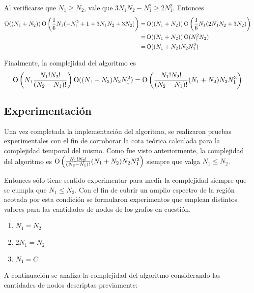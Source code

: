 \newpage
Al verificarse que $N_1 \geq N_2$, vale que $3N_1N_2 - N_1^2 \geq 2N_1^2$.
Entonces
\begin{align*}
\operatorname{O}((N_1 + N_2))  \operatorname{O}\left(\frac{1}{6}N_1(-N_1^2 + 1 + 3N_1N_2 + 3N_2)\right)
=& \operatorname{O}((N_1 + N_2))  \operatorname{O}\left(\frac{1}{6}N_1(2N_1N_2 + 3N_2)\right) \\
=& \operatorname{O}((N_1 + N_2))  \operatorname{O}(N_1^2N_2) \\
=& \operatorname{O}((N_1 + N_2)  N_2  N_1^2)
\end{align*}

Finalmente, la complejidad del algoritmo es
\[
\operatorname{O}\left(N_1 \frac{N_1!  N_2!}{(N_2 - N_1)!}\right) \operatorname{O}((N_1 + N_2)  N_2  N_1^2) =
\operatorname{O}\left(\frac{N_1!  N_2!}{(N_2 - N_1)!} (N_1 + N_2)  N_2  N_1^3\right)
\]

\subsection{Experimentación}

Una vez completada la implementación del algoritmo, se realizaron pruebas
experimentales con el fin de corroborar la cota teórica calculada para la
complejidad temporal del mismo. Como fue visto anteriormente, la complejidad
del algoritmo es
$\operatorname{O}\left(\frac{N_1!  N_2!}{(N_2 - N_1)!} (N_1 + N_2)  N_2  N_1^3\right)$
siempre que valga $N_1 \leq N_2$.

Entonces sólo tiene sentido experimentar para medir la complejidad siempre
que se cumpla que $N_1 \leq N_2$. Con el fin de cubrir un amplio espectro de
la región acotada por esta condición se formularon experimentos que emplean
distintos valores para las cantidades de nodos de los grafos en cuestión.

\begin{enumerate}[label=\alph*)]
\item $N_1 = N_2$
\item $2N_1 = N_2$
\item $N_1 = C$
\end{enumerate}

A continuación se analiza la complejidad del algoritmo considerando las
cantidades de nodos descriptas previamente:

